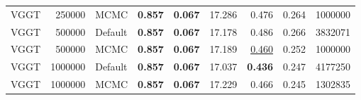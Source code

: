 \begin{table}[H]
\begin{tabular}{lrlrrrrrr}
VGGT & 250000 & MCMC & \textbf{0.857} & \textbf{0.067} & 17.286 & 0.476 & 0.264 & 1000000 \\
VGGT & 500000 & Default & \textbf{0.857} & \textbf{0.067} & 17.178 & 0.486 & 0.266 & 3832071 \\
VGGT & 500000 & MCMC & \textbf{0.857} & \textbf{0.067} & 17.189 & \underline{0.460} & 0.252 & 1000000 \\
VGGT & 1000000 & Default & \textbf{0.857} & \textbf{0.067} & 17.037 & \textbf{0.436} & 0.247 & 4177250 \\
VGGT & 1000000 & MCMC & \textbf{0.857} & \textbf{0.067} & 17.229 & 0.466 & 0.245 & 1302835 \\
\bottomrule
\end{tabular}
\end{table}
